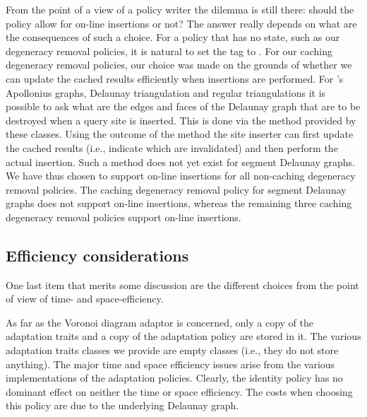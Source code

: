 From the point of a view of a policy writer the dilemma is still
there: should the policy allow for on-line insertions or not? The
answer really depends on what are the consequences of such a
choice. For a policy that has no state, such as our degeneracy removal
policies, it is natural to set the  tag to
. For our caching degeneracy removal policies, our
choice was made on the grounds of whether we can update the cached
results efficiently when insertions are performed. For \cgal's
Apollonius graphs, Delaunay triangulation and regular triangulations
it is possible to ask what are the edges and faces of the Delaunay
graph that are to be destroyed when a query site is inserted. This is
done via the  method provided by these
classes. Using the outcome of the  method the site
inserter can first update the cached results (i.e., indicate which are
invalidated) and then perform the actual insertion. Such a method does
not yet exist for segment Delaunay graphs. We have thus chosen to
support on-line insertions for all non-caching degeneracy removal
policies. The caching degeneracy removal policy for segment Delaunay
graphs does not support on-line insertions, whereas the remaining
three caching degeneracy removal policies support on-line insertions.




\subsection{Efficiency considerations}
\label{subsec:vda2-efficiency}

One last item that merits some discussion are the different choices
from the point of view of time- and space-efficiency.

As far as the Voronoi diagram adaptor is concerned, only a copy of the
adaptation traits and a copy of the adaptation policy are stored in it.
The various adaptation traits classes we provide are empty
classes (i.e., they do not store anything). The major time and space
efficiency issues arise from the various implementations of the
adaptation policies.
%
Clearly, the identity policy has no dominant effect on neither the
time or space efficiency. The costs when choosing this policy are due
to the underlying Delaunay graph.

